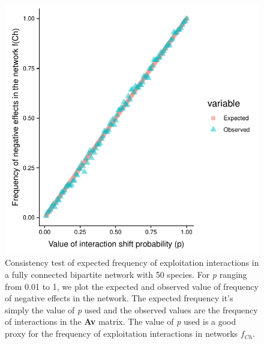 \documentclass[a4paper, 12pt]{article}
\begin{document}
\begin{singlespace}
\begin{figure}[H]
 \centering
  \includegraphics[width=\linewidth]{Sup_Figura_2.pdf}
  \vspace*{-7mm}
  \caption{Consistency test of expected frequency of exploitation interactions in a fully connected bipartite network with 50 species. For \textit{p} ranging from 0.01 to 1, we plot the expected and observed value of frequency of negative effects in the network. The expected frequency it's simply the value of \textit{p} used and the observed values are the frequency of interactions in the \textbf{Av} matrix. The value of \textit{p} used is a good proxy for the frequency of exploitation interactions in networks $f_{Ch}$.}
  \label{supfig:2}
\end{figure}


\end{singlespace}
\end{document}
